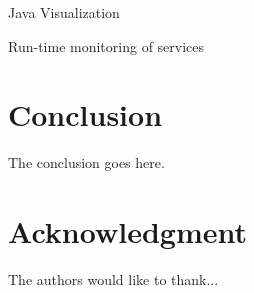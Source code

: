 \documentclass[conference]{IEEEtran}
\begin{document}
Java Visualization \cite{Pauw02a}

Run-time monitoring of services \cite{ghezzi2007run}

\section{Conclusion}
The conclusion goes here.






\section*{Acknowledgment}


The authors would like to thank...










\end{document}
